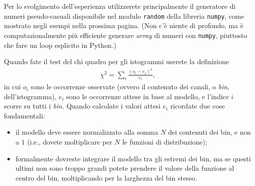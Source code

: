 \documentclass{lab1-article}
\begin{document}
\begin{article}
\secconsiderations

Per lo svolgimento dell'esperienza utilizzerete principalmente il generatore di
numeri pseudo-casuali disponibile nel modulo \texttt{random} della libreria \texttt{numpy},
come mostrato negli esempi nella prossima pagina. (Non c'\`e niente di profondo, ma
\`e computazionalmente pi\`u efficiente generare \emph{array} di numeri con
\texttt{numpy}, piuttosto che fare un loop esplicito in Python.)

Quando fate il test del chi quadro per gli istogrammi userete la definizione
\begin{align}
    \chi^2 = \sum_i \frac{(o_i - e_i)^2}{e_i},
\end{align}
in cui $o_i$ sono le occorrenze osservate (ovvero il contenuto dei canali, o \emph{bin},
dell'istogramma), $e_i$ sono le occorrenze attese in base al modello, e l'indice
$i$ scorre su tutti i \emph{bin}. Quando calcolate i valori attesi $e_i$ ricordate
due cose fondamentali:
\begin{itemize}
  \item il modello deve essere normalizzato alla somma $N$ dei contenuti
    dei bin, e non a $1$ (i.e., dovete moltiplicare per $N$ le funzioni di distribuzione);
  \item  formalmente dovreste integrare il modello tra gli estremi dei bin, ma se
    questi ultimi non sono troppo grandi potete prendere il valore della funzione
    al centro del bin, moltiplicando per la larghezza del bin stesso.
\end{itemize}



\onecolumn




\end{article}
\end{document}
